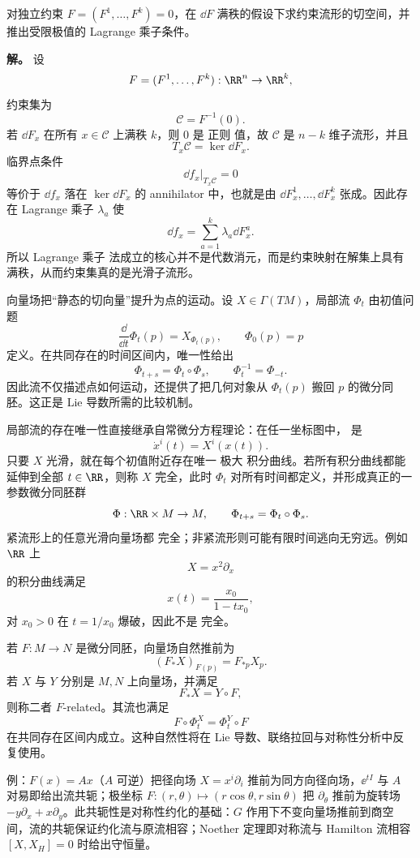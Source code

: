 \begin{exbox}
对独立约束 $F=(F^1,\ldots,F^k)=0$，在 $\dd F$ 满秩的假设下求约束流形的切空间，并推出受限极值的 Lagrange 乘子条件。

\textbf{解。} 设
\[
F=(F^1,\ldots,F^k):\RR^n\to\RR^k,
\]
约束集为
\[
\mathcal C=F^{-1}(0).
\]
若 $\dd F_x$ 在所有 $x\in\mathcal C$ 上满秩 $k$，则 $0$ 是 正则 值，故 $\mathcal C$ 是 $n-k$ 维子流形，并且
\[
T_x\mathcal C=\ker\dd F_x.
\]
临界点条件
\[
\dd f_x|_{T_x\mathcal C}=0
\]
等价于 $\dd f_x$ 落在 $\ker\dd F_x$ 的 annihilator 中，也就是由 $\dd F^1_x,\ldots,\dd F^k_x$ 张成。因此存在 Lagrange 乘子 $\lambda_a$ 使
\[
\dd f_x=\sum_{a=1}^k\lambda_a\dd F^a_x.
\]
所以 Lagrange 乘子 法成立的核心并不是代数消元，而是约束映射在解集上具有满秩，从而约束集真的是光滑子流形。
\end{exbox}
向量场把“静态的切向量”提升为点的运动。设 $X\in\Gamma(TM)$，局部流 $\Phi_t$ 由初值问题
\begin{equation}\label{eq:math-dg-flow-ode}
\frac{\dd}{\dd t}\Phi_t(p)=X_{\Phi_t(p)},
\qquad
\Phi_0(p)=p
\end{equation}
定义。在共同存在的时间区间内，唯一性给出
\[
\Phi_{t+s}=\Phi_t\circ\Phi_s,
\qquad
\Phi_t^{-1}=\Phi_{-t}.
\]
因此流不仅描述点如何运动，还提供了把几何对象从 $\Phi_t(p)$ 搬回 $p$ 的微分同胚。这正是 Lie 导数所需的比较机制。

局部流的存在唯一性直接继承自常微分方程理论：在任一坐标图中， 是
\[
\dot x^i(t)=X^i(x(t)).
\]
只要 $X$ 光滑，就在每个初值附近存在唯一 极大 积分曲线。若所有积分曲线都能延伸到全部 $t\in\RR$，则称 $X$ 完全，此时 $\Phi_t$ 对所有时间都定义，并形成真正的一参数微分同胚群
\[
\Phi:\RR\times M\to M,
\qquad
\Phi_{t+s}=\Phi_t\circ\Phi_s.
\]
紧流形上的任意光滑向量场都 完全；非紧流形则可能有限时间逃向无穷远。例如 $\RR$ 上
\[
X=x^2\partial_x
\]
的积分曲线满足
\[
x(t)=\frac{x_0}{1-tx_0},
\]
对 $x_0>0$ 在 $t=1/x_0$ 爆破，因此不是 完全。

若 $F:M\to N$ 是微分同胚，向量场自然推前为
\[
(F_*X)_{F(p)}=F_{*p}X_p.
\]
若 $X$ 与 $Y$ 分别是 $M,N$ 上向量场，并满足
\[
F_*X=Y\circ F,
\]
则称二者 $F$-related。其流也满足
\begin{equation}
F\circ\Phi_t^X=\Phi_t^Y\circ F
\label{eq:related-flow-naturality}
\end{equation}
在共同存在区间内成立。这种自然性将在 Lie 导数、联络拉回与对称性分析中反复使用。

例：$F(x)=Ax$（$A$ 可逆）把径向场 $X=x^i\partial_i$ 推前为同方向径向场，$\ee^{tI}$ 与 $A$ 对易即给出流共轭；极坐标 $F:(r,\theta)\mapsto(r\cos\theta,r\sin\theta)$ 把 $\partial_\theta$ 推前为旋转场 $-y\partial_x+x\partial_y$。此共轭性是对称性约化的基础：$G$ 作用下不变向量场推前到商空间，流的共轭保证约化流与原流相容；Noether 定理即对称流与 Hamilton 流相容 $[X,X_H]=0$ 时给出守恒量。

